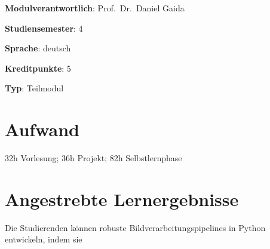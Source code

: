 \begin{modulHead}
\textbf{Modulverantwortlich}: Prof.~Dr.~Daniel
Gaida
\end{modulHead}
\begin{modulHead}
\textbf{Studiensemester}:
4
\end{modulHead}
\begin{modulHead}
\textbf{Sprache}:
deutsch
\end{modulHead}
\begin{modulHead}
\textbf{Kreditpunkte}:
5
\end{modulHead}
\begin{modulHead}
\textbf{Typ}:
Teilmodul
\end{modulHead}


\hypertarget{aufwandpathlabelmi-2017modulbeschreibungen-bachelorba_vc-bildverarbeitung-und-computer-vision}{%
\section*{Aufwand\label{/mi-2017/modulbeschreibungen-bachelor/BA_VC-bildverarbeitung-und-computer-vision}}\label{aufwandpathlabelmi-2017modulbeschreibungen-bachelorba_vc-bildverarbeitung-und-computer-vision}}

32h Vorlesung; 36h Projekt; 82h Selbstlernphase

\hypertarget{angestrebte-lernergebnissepathlabelmi-2017modulbeschreibungen-bachelorba_vc-bildverarbeitung-und-computer-vision}{%
\section*{Angestrebte
Lernergebnisse\label{/mi-2017/modulbeschreibungen-bachelor/BA_VC-bildverarbeitung-und-computer-vision}}\label{angestrebte-lernergebnissepathlabelmi-2017modulbeschreibungen-bachelorba_vc-bildverarbeitung-und-computer-vision}}

Die Studierenden können robuste Bildverarbeitungspipelines in Python
entwickeln, indem sie

